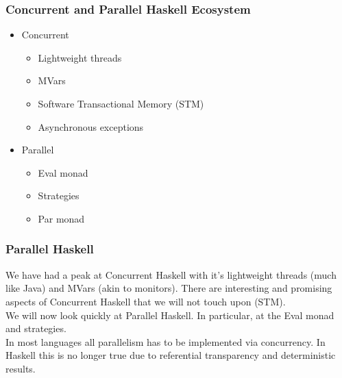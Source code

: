 \documentclass[notheorems]{beamer}%
\theoremstyle{definition}
\begin{document}
\begin{frame}
  \frametitle{Concurrent and Parallel Haskell Ecosystem }
  \begin{itemize}
  \item Concurrent
    \begin{itemize}
    \item Lightweight threads
    \item MVars
    \item Software Transactional Memory (STM)
    \item Asynchronous exceptions
    \end{itemize}
  \item Parallel
    \begin{itemize}
    \item Eval monad
    \item Strategies
    \item Par monad
    \end{itemize}
  \end{itemize}
\end{frame}

\begin{frame}
  \frametitle{Parallel Haskell}
  We have had a peak at Concurrent Haskell with it's lightweight threads (much
  like Java) and MVars (akin to monitors). There are interesting and promising
  aspects of Concurrent Haskell that we will not touch upon (STM).\\[2ex]
  We will now look quickly at Parallel Haskell. In particular, at the Eval
  monad and strategies.\\[2ex]
  In most languages all parallelism has to be implemented via
  concurrency. In Haskell this is no longer true due to referential
  transparency and deterministic results.
\end{frame}


\end{document}

